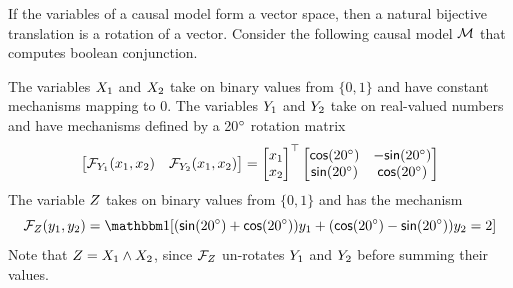 \documentclass[twoside,11pt]{article}
\begin{document}
\begin{example}
If the variables of a causal model form a vector space, then a natural bijective translation is a rotation of a vector. Consider the following causal model $\mathcal{M}$ that computes boolean conjunction.

\begin{center}
\end{center}

The variables $X_1$ and $X_2$ take on binary values from $\{0,1\}$ and have constant mechanisms mapping to $0$. The variables $Y_1$ and $Y_2$ take on real-valued numbers and have mechanisms defined by a 20$\degree$ rotation matrix
\[\begin{bmatrix}\mathcal{F}_{Y_1}(x_1, x_2) & \mathcal{F}_{Y_2}(x_1, x_2)\end{bmatrix} = \begin{bmatrix} x_1\\ x_2\end{bmatrix}^\top \begin{bmatrix} \mathsf{cos}(20\degree) & -\mathsf{sin}(20\degree) \\ \mathsf{sin}(20\degree) & \mathsf{cos}(20\degree) \end{bmatrix} \]
The variable $Z$ takes on binary values from $\{0,1\}$ and has the mechanism \[\mechanism{\onevarrr}(\onevall_1, \onevall_2) = \indicator{(\mathsf{sin}(20\degree) + \mathsf{cos}(20\degree))\onevall_1 + (\mathsf{cos}(20\degree) - \mathsf{sin}(20\degree))\onevall_2 = 2}\] Note that $Z = X_1 \land X_2$, since $\mathcal{F}_{Z}$ un-rotates $Y_1$ and $Y_2$ before summing their values.


\end{example}
\end{document}
